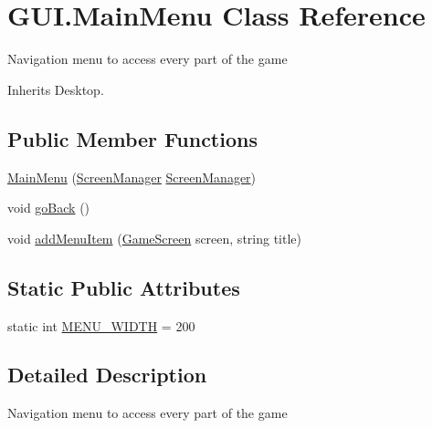 \hypertarget{class_g_u_i_1_1_main_menu}{\section{G\+U\+I.\+Main\+Menu Class Reference}
\label{class_g_u_i_1_1_main_menu}
}


Navigation menu to access every part of the game  




Inherits Desktop.

\subsection*{Public Member Functions}
\begin{DoxyCompactItemize}
\item 
\hyperlink{class_g_u_i_1_1_main_menu_aa2fbb046a79ac7fe98379ca531bc1f34}{Main\+Menu} (\hyperlink{classgearit_1_1xna_1_1_screen_manager}{Screen\+Manager} \hyperlink{classgearit_1_1xna_1_1_screen_manager}{Screen\+Manager})
\item 
void \hyperlink{class_g_u_i_1_1_main_menu_aba7d8355fe79f4d3f2014914902543fa}{go\+Back} ()
\item 
void \hyperlink{class_g_u_i_1_1_main_menu_a8abc2a8432ad5550f3b12b5b09eb9fa1}{add\+Menu\+Item} (\hyperlink{classgearit_1_1xna_1_1_game_screen}{Game\+Screen} screen, string title)
\end{DoxyCompactItemize}
\subsection*{Static Public Attributes}
\begin{DoxyCompactItemize}
\item 
static int \hyperlink{class_g_u_i_1_1_main_menu_acc4b53f22a7538aa0b5708ad5d2a73ce}{M\+E\+N\+U\+\_\+\+W\+I\+D\+T\+H} = 200
\end{DoxyCompactItemize}


\subsection{Detailed Description}
Navigation menu to access every part of the game 



